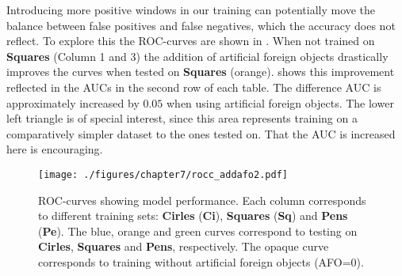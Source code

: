 Introducing more positive windows in our training can potentially move the balance between false positives and false negatives, which the accuracy does not reflect. To explore this the \acp{ROC-curve} are shown in .
When not trained on \textbf{Squares} (Column 1 and 3) the addition of artificial foreign objects drastically improves the curves when tested on \textbf{Squares} (orange). 
 shows this improvement reflected in the \acp{AUC} in the second row of each table. The difference \ac{AUC} is approximately increased by $0.05$ when using artificial foreign objects.
The lower left triangle is of special interest, since this area represents training on a comparatively simpler dataset to the ones tested on. That the \ac{AUC} is increased here is encouraging.

\begin{figure}[h]
	\begin{whole}
		\texttt{[image: ./figures/chapter7/rocc\_addafo2.pdf]}
		\caption{\acp{ROC-curve} showing model performance. Each column corresponds to different training sets: \textbf{Cirles} (\textbf{Ci}), \textbf{Squares} (\textbf{Sq}) and \textbf{Pens} (\textbf{Pe}).
		The blue, orange and green curves correspond to testing on \textbf{Cirles}, \textbf{Squares} and \textbf{Pens}, respectively. The opaque curve corresponds to training without artificial foreign objects (AFO=0).
		}
		\label{fig:rocc_afo}
	\end{whole}
\end{figure}

